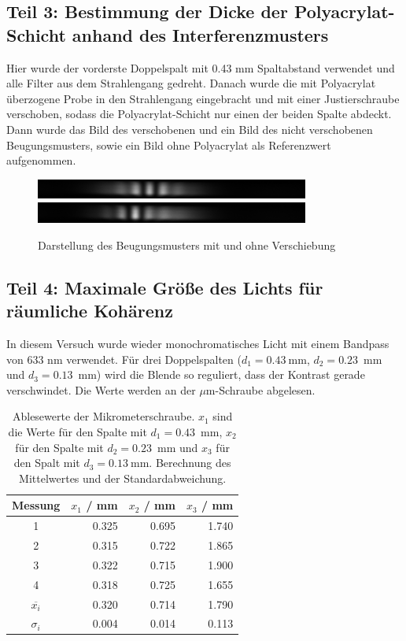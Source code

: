 \documentclass{article}
\begin{document}
\subsection{Teil 3: Bestimmung der Dicke der Polyacrylat-Schicht anhand des Interferenzmusters}

Hier wurde der vorderste Doppelspalt mit 0.43 mm Spaltabstand verwendet und alle Filter aus dem Strahlengang gedreht. Danach wurde die mit Polyacrylat überzogene Probe in den Strahlengang eingebracht und mit einer Justierschraube verschoben, sodass die Polyacrylat-Schicht nur einen der beiden Spalte abdeckt. Dann wurde das Bild des verschobenen und ein Bild des nicht verschobenen Beugungsmusters, sowie ein Bild ohne Polyacrylat als Referenzwert aufgenommen.

\begin{figure}[H]
\centering
\caption{Darstellung des Beugungsmusters mit und ohne Verschiebung}
\includegraphics[width=9cm]{moodle/img_noShift.png}
\includegraphics[width=9cm]{moodle/img_Shift.png}
\end{figure}


\subsection{Teil 4: Maximale Größe des Lichts für räumliche Kohärenz}

In diesem Versuch wurde wieder monochromatisches Licht mit einem Bandpass von 633 nm verwendet. Für drei Doppelspalten ($d_1=0.43~$mm, $d_2=0.23$~mm und $d_3=0.13$~mm) wird die Blende so reguliert, dass der Kontrast gerade verschwindet. Die Werte werden an der $\mu$m-Schraube abgelesen.

\begin{table}[H]
\caption{Ablesewerte der Mikrometerschraube. $x_1$ sind die Werte für den Spalte mit $d_1=0.43$~mm, $x_2$ für den Spalte mit $d_2=0.23$~mm und $x_3$ für den Spalt mit $d_3=0.13~$mm. Berechnung des Mittelwertes und der Standardabweichung.}
\begin{tabular}{c|rrr}
Messung & $x_1$ / mm & $x_2$ / mm & $x_3$ / mm \\
\hline
1 & 0.325 & 0.695 & 1.740 \\
2 & 0.315 & 0.722 & 1.865 \\
3 & 0.322 & 0.715 & 1.900 \\
4 & 0.318 & 0.725 & 1.655 \\
\hline 
$\overline{x_i}$ & 0.320 & 0.714 & 1.790 \\
$\sigma_i$ & 0.004 & 0.014 & 0.113
\end{tabular}

\end{table}
\end{document}
